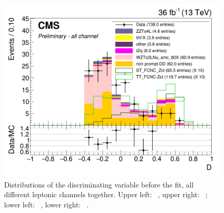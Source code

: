 \begin{figure}[htbp]
	  \includegraphics[width=0.49\linewidth]{6_Search/Figures/BDTunweighted/singletop_Zct_BDT_all_Stack}
	\caption{Distributions of the discriminating variable before the fit, all different leptonic channels together. Upper left: \TTSR\ \Zut , upper right: \TTSR\ \Zct ; lower left: \STSR\  \Zut , lower right: \STSR\  \Zct .}
	\label{fig:bdtallstack}
\end{figure}	

